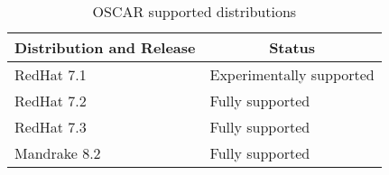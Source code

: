 %
%
%

\begin{table}[htbp]
  \begin{center}
    \begin{tabular}{|l|p{3in}|}
      \hline
      \multicolumn{1}{|c|}{Distribution and Release} &
      \multicolumn{1}{|c|}{Status} \\
      \hline
      \hline
      RedHat 7.1 & Experimentally supported \\
%
      RedHat 7.2 & Fully supported \\
%
      RedHat 7.3 & Fully supported \\
%
\hline
%
      Mandrake 8.2 & Fully supported \\
      \hline
    \end{tabular}
    \caption{OSCAR supported distributions}
    \label{tab:oscar-distro-support}
  \end{center}
\end{table}
